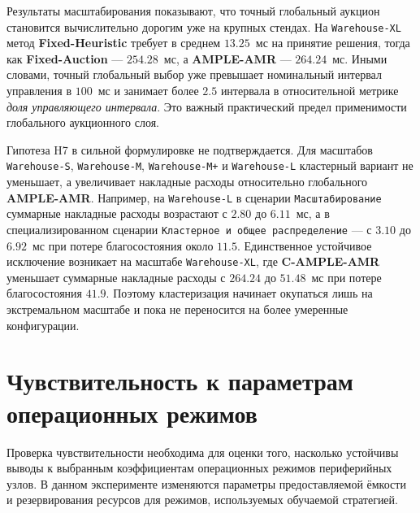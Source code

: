 



Результаты масштабирования показывают, что точный глобальный аукцион становится вычислительно дорогим уже на крупных стендах. На \texttt{Warehouse-XL} метод \textbf{Fixed-Heuristic} требует в среднем $13.25$~мс на принятие решения, тогда как \textbf{Fixed-Auction} --- $254.28$~мс, а \textbf{AMPLE-AMR} --- $264.24$~мс. Иными словами, точный глобальный выбор уже превышает номинальный интервал управления в $100$~мс и занимает более $2.5$ интервала в относительной метрике \textit{доля управляющего интервала}. Это важный практический предел применимости глобального аукционного слоя.

Гипотеза H7 в сильной формулировке не подтверждается. Для масштабов \texttt{Warehouse-S}, \texttt{Warehouse-M}, \texttt{Warehouse-M+} и \texttt{Warehouse-L} кластерный вариант не уменьшает, а увеличивает накладные расходы относительно глобального \textbf{AMPLE-AMR}. Например, на \texttt{Warehouse-L} в сценарии \texttt{Масштабирование} суммарные накладные расходы возрастают с $2.80$ до $6.11$~мс, а в специализированном сценарии \texttt{Кластерное и общее распределение} --- с $3.10$ до $6.92$~мс при потере благосостояния около $11.5$. Единственное устойчивое исключение возникает на масштабе \texttt{Warehouse-XL}, где \textbf{C-AMPLE-AMR} уменьшает суммарные накладные расходы с $264.24$ до $51.48$~мс при потере благосостояния $41.9$. Поэтому кластеризация начинает окупаться лишь на экстремальном масштабе и пока не переносится на более умеренные конфигурации.

\section{Чувствительность к параметрам операционных режимов}

Проверка чувствительности необходима для оценки того, насколько устойчивы выводы к выбранным коэффициентам операционных режимов периферийных узлов. В данном эксперименте изменяются параметры предоставляемой ёмкости и резервирования ресурсов для режимов, используемых обучаемой стратегией.


